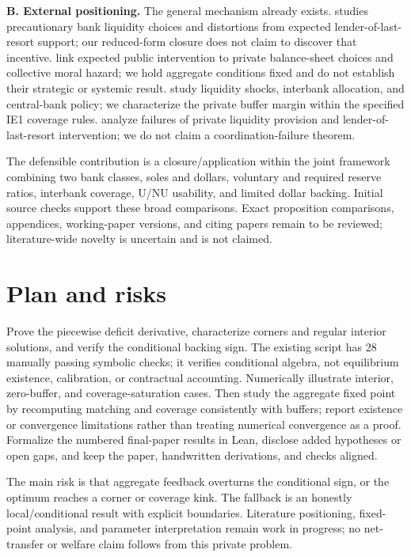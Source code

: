\documentclass[11pt]{article}
\begin{document}
\textbf{B. External positioning.} The general mechanism already exists. \citet{ratnovski2009} studies precautionary bank liquidity choices and distortions from expected lender-of-last-resort support; our reduced-form closure does not claim to discover that incentive. \citet{farhi2012} link expected public intervention to private balance-sheet choices and collective moral hazard; we hold aggregate conditions fixed and do not establish their strategic or systemic result. \citet{freixas2011} study liquidity shocks, interbank allocation, and central-bank policy; we characterize the private buffer margin within the specified IE1 coverage rules. \citet{rochet2004} analyze failures of private liquidity provision and lender-of-last-resort intervention; we do not claim a coordination-failure theorem.

The defensible contribution is a closure/application within the joint framework combining two bank classes, soles and dollars, voluntary and required reserve ratios, interbank coverage, U/NU usability, and limited dollar backing. Initial source checks support these broad comparisons. Exact proposition comparisons, appendices, working-paper versions, and citing papers remain to be reviewed; literature-wide novelty is uncertain and is not claimed.

\section{Plan and risks}
Prove the piecewise deficit derivative, characterize corners and regular interior solutions, and verify the conditional backing sign. The existing script has 28 manually passing symbolic checks; it verifies conditional algebra, not equilibrium existence, calibration, or contractual accounting. Numerically illustrate interior, zero-buffer, and coverage-saturation cases. Then study the aggregate fixed point by recomputing matching and coverage consistently with buffers; report existence or convergence limitations rather than treating numerical convergence as a proof. Formalize the numbered final-paper results in Lean, disclose added hypotheses or open gaps, and keep the paper, handwritten derivations, and checks aligned.

The main risk is that aggregate feedback overturns the conditional sign, or the optimum reaches a corner or coverage kink. The fallback is an honestly local/conditional result with explicit boundaries. Literature positioning, fixed-point analysis, and parameter interpretation remain work in progress; no net-transfer or welfare claim follows from this private problem.



\end{document}
